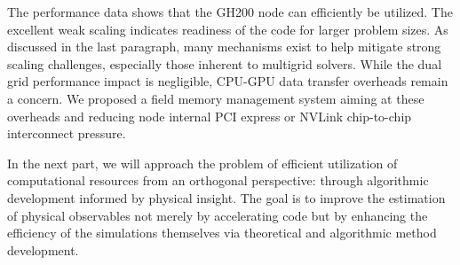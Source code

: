 The performance data shows that the GH200 node can efficiently be utilized.
The excellent weak scaling indicates readiness of the code for larger problem sizes.
As discussed in the last paragraph, many mechanisms exist to help mitigate strong scaling challenges, especially those inherent to multigrid solvers.
While the dual grid performance impact is negligible, CPU-GPU data transfer overheads remain a concern.
We proposed a field memory management system aiming at these overheads and reducing node internal PCI express or NVLink chip-to-chip interconnect pressure.

In the next part, we will approach the problem of efficient utilization of computational resources from an orthogonal perspective: through algorithmic development informed by physical insight.
The goal is to improve the estimation of physical observables not merely by accelerating code but by enhancing the efficiency of the simulations themselves via theoretical and algorithmic method development.


